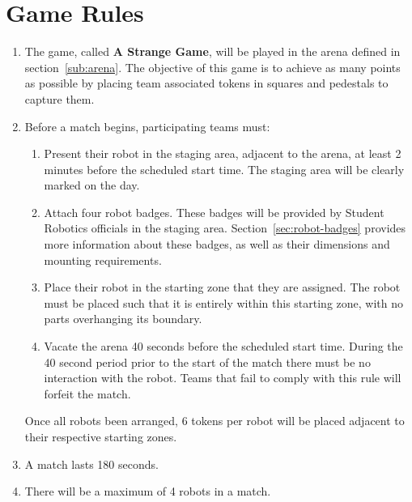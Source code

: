 \section {Game Rules}
\label{game-rules}

\begin{enumerate}
\item The game, called \textbf{A Strange Game}, will be played in the arena defined in section~\ref{sub:arena}.
      The objective of this game is to achieve as many points as possible by placing team associated tokens in squares and pedestals to capture them.

\item Before a match begins, participating teams must:
\begin {enumerate}
  \item Present their robot in the staging area, adjacent to the arena, at least 2 minutes before the scheduled start time.
        The staging area will be clearly marked on the day.

  \item Attach four robot badges.
        These badges will be provided by Student Robotics officials in the staging area.
        Section~\ref{sec:robot-badges} provides more information about these badges, as well as their dimensions and mounting requirements.

  \item Place their robot in the starting zone that they are assigned.
        The robot must be placed such that it is entirely within this starting zone, with no parts overhanging its boundary.

  \item Vacate the arena 40 seconds before the scheduled start time.
        During the 40 second period prior to the start of the match there must be no interaction with the robot.
	Teams that fail to comply with this rule will forfeit the match.
\end{enumerate}
      Once all robots been arranged, 6 tokens per robot will be placed adjacent to their respective starting zones.

\item A match lasts 180 seconds.

\item There will be a maximum of 4 robots in a match.


\end{enumerate}

